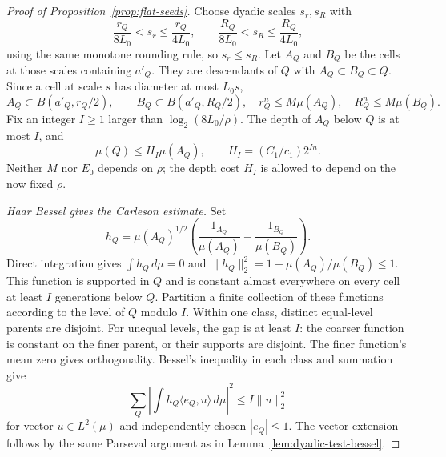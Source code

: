 \begin{proof}[Proof of Proposition~\ref{prop:flat-seeds}]
Choose dyadic scales $s_r,s_R$ with
\[
 \frac{r_Q}{8L_0}<s_r\le\frac{r_Q}{4L_0},\qquad
 \frac{R_Q}{8L_0}<s_R\le\frac{R_Q}{4L_0},
\]
using the same monotone rounding rule, so $s_r\le s_R$.
Let $A_Q$ and $B_Q$ be the cells at those scales containing $a'_Q$.
They are descendants of $Q$ with $A_Q\subset B_Q\subset Q$.
Since a cell at scale $s$ has diameter at most $L_0s$,
\[
 A_Q\subset B(a'_Q,r_Q/2),\qquad
 B_Q\subset B(a'_Q,R_Q/2),
 \quad r_Q^n\le M\mu(A_Q),\quad R_Q^n\le M\mu(B_Q).
\]
Fix an integer $I\ge1$ larger than $\log_2(8L_0/\rho)$.
The depth of $A_Q$ below $Q$ is at most $I$, and
\begin{equation}\label{eq:haar-inner-parent-mass}
 \mu(Q)\le H_I\mu(A_Q),\qquad
 H_I=(C_1/c_1)2^{In}.
\end{equation}
Neither $M$ nor $E_0$ depends on $\rho$; the depth cost $H_I$ is allowed
to depend on the now fixed $\rho$.

\smallskip\noindent
\emph{Haar Bessel gives the Carleson estimate.}
Set
\[
 h_Q=\mu(A_Q)^{1/2}
       \left(\frac{1_{A_Q}}{\mu(A_Q)}-
             \frac{1_{B_Q}}{\mu(B_Q)}\right).
\]
Direct integration gives $\int h_Q\,d\mu=0$ and
$\|h_Q\|_2^2=1-\mu(A_Q)/\mu(B_Q)\le1$.
This function is supported in $Q$ and is constant almost everywhere on
every cell at least $I$ generations below $Q$.
Partition a finite collection of these functions according to the
level of $Q$ modulo $I$. Within one class, distinct equal-level parents
are disjoint. For unequal levels, the gap is at least $I$: the coarser
function is constant on the finer parent, or their supports are
disjoint. The finer function's mean zero gives orthogonality. Bessel's
inequality in each class and summation give
\begin{equation}\label{eq:bounded-depth-haar-bessel}
 \sum_Q\left|\int h_Q\langle e_Q,u\rangle\,d\mu\right|^2
 \le I\|u\|_2^2
\end{equation}
for vector $u\in L^2(\mu)$ and independently chosen $|e_Q|\le1$.
The vector extension follows by the same Parseval argument as in
Lemma~\ref{lem:dyadic-test-bessel}.


\end{proof}
